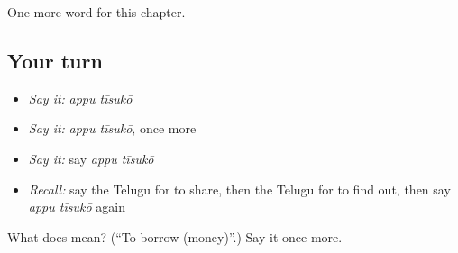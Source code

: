 \begin{grammarlens}[title={What you've built}]
One more word for this chapter.
\end{grammarlens}

\subsection*{Your turn}
\begin{itemize}
\raggedright
  \item \emph{Say it:} \emph{appu tīsukō}
  \item \emph{Say it:} \emph{appu tīsukō}, once more
  \item \emph{Say it:} say \emph{appu tīsukō}
  \item \emph{Recall:} say the Telugu for to share, then the Telugu for to find out, then say \emph{appu tīsukō} again
\end{itemize}

\begin{tcolorbox}[breakable,colback=teal!4,colframe=teal!35!black,title={Before you move on}]
What does   mean? (\textquotedblleft{}To borrow (money)\textquotedblright{}.) Say it once more.
\end{tcolorbox}
